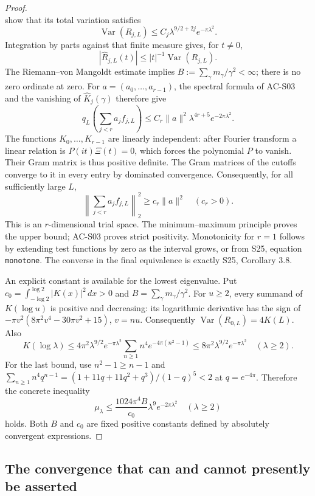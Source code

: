 \begin{proof}
\[\]
show that its total variation satisfies
\[
 \operatorname{Var}(R_{j,L})
 \leq C_j\lambda^{9/2+2j}e^{-\pi\lambda^2}.
\]
Integration by parts against that finite measure gives, for \(t\ne0\),
\[
 |\widehat R_{j,L}(t)|
       \leq |t|^{-1}\operatorname{Var}(R_{j,L}).
\]
The Riemann--von Mangoldt estimate implies
\(B:=\sum_\gamma m_\gamma/\gamma^2<\infty\); there is no zero
ordinate at zero.  For \(a=(a_0,\ldots,a_{r-1})\), the spectral
formula of AC-S03 and the vanishing of \(\widehat K_j(\gamma)\)
therefore give
\[
 q_L\left(\sum_{j<r}a_jf_{j,L}\right)
 \leq C_r\|a\|^2\lambda^{4r+5}e^{-2\pi\lambda^2}.
\]
The functions \(K_0,\ldots,K_{r-1}\) are linearly independent:
after Fourier transform a linear relation is
\(P(it)\Xi(t)=0\), which forces the polynomial \(P\) to vanish.
Their Gram matrix is thus positive definite.  The Gram matrices of
the cutoffs converge to it in every entry by dominated convergence.
Consequently, for all sufficiently large \(L\),
\[
 \left\|\sum_{j<r}a_jf_{j,L}\right\|_2^2
           \geq c_r\|a\|^2\quad(c_r>0).
\]
This is an \(r\)-dimensional trial space.  The minimum--maximum
principle proves the upper bound; AC-S03 proves strict positivity.
Monotonicity for \(r=1\) follows by extending test functions by zero
as the interval grows, or from S25, equation \texttt{monotone}.
The converse in the final equivalence is exactly S25, Corollary 3.8.

An explicit constant is available for the lowest eigenvalue.  Put
\(c_0=\int_{-\log2}^{\log2}|K(x)|^2\,dx>0\) and
\(B=\sum_\gamma m_\gamma/\gamma^2\).  For \(u\geq2\), every
summand of \(K(\log u)\) is positive and decreasing: its logarithmic
derivative has the sign of
\(-\pi v^2(8\pi^2v^4-30\pi v^2+15)\), \(v=nu\).
Consequently \(\operatorname{Var}(R_{0,L})=4K(L)\).
Also
\[
 K(\log\lambda)\leq
 4\pi^2\lambda^{9/2}e^{-\pi\lambda^2}
       \sum_{n\geq1}n^4e^{-4\pi(n^2-1)}
 \leq8\pi^2\lambda^{9/2}e^{-\pi\lambda^2}
 \quad(\lambda\geq2).
\]
For the last bound, use \(n^2-1\geq n-1\) and
\(\sum_{n\geq1}n^4q^{n-1}=(1+11q+11q^2+q^3)/(1-q)^5<2\)
at \(q=e^{-4\pi}\).  Therefore the concrete inequality
\[
 \mu_\lambda\leq
 \frac{1024\pi^4B}{c_0}\lambda^9e^{-2\pi\lambda^2}
 \quad(\lambda\geq2)
\]
holds.  Both \(B\) and \(c_0\) are fixed positive constants defined
by absolutely convergent expressions.
\end{proof}

\subsection{The convergence that can and cannot presently be asserted}

